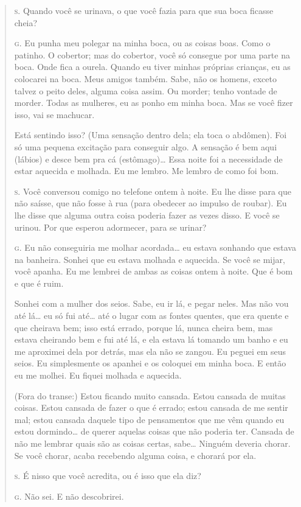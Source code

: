 \begin{quote}
\noindent\hskip0mm\textsc{s.} Quando você se urinava, o que você fazia para que sua boca ficasse
cheia?

\noindent\hskip0mm\textsc{g.} Eu punha meu polegar na minha boca, ou as coisas boas. Como o
patinho. O cobertor; mas do cobertor, você só consegue por uma parte na
boca. Onde fica a ourela. Quando eu tiver minhas próprias crianças, eu
as colocarei na boca. Meus amigos também. Sabe, não os homens, exceto
talvez o peito deles, alguma coisa assim. Ou morder; tenho vontade de
morder. Todas as mulheres, eu as ponho em minha boca. Mas se você fizer
isso, vai se machucar.

Está sentindo isso? (Uma sensação dentro dela; ela toca o abdômen).
Foi só uma pequena excitação para conseguir algo. A sensação é bem aqui
(lábios) e desce bem pra cá (estômago)\ldots{} Essa noite foi a necessidade
de estar aquecida e molhada. Eu me lembro. Me lembro de como foi bom.

\noindent\hskip0mm\textsc{s.} Você conversou comigo no telefone ontem à noite. Eu lhe disse para
que não saísse, que não fosse à rua (para obedecer ao impulso de
roubar). Eu lhe disse que alguma outra coisa poderia fazer as vezes
disso. E você se urinou. Por que esperou adormecer, para se urinar?

\noindent\hskip0mm\textsc{g.} Eu não conseguiria me molhar acordada\ldots{} eu estava sonhando que
estava na banheira. Sonhei que eu estava molhada e aquecida. Se você se
mijar, você apanha. Eu me lembrei de ambas as coisas ontem à noite. Que
é bom e que é ruim.

Sonhei com a mulher dos seios. Sabe, eu ir lá, e pegar neles. Mas
não vou até lá\ldots{} eu só fui até\ldots{} até o lugar com as fontes quentes,
que era quente e que cheirava bem; isso está errado, porque lá, nunca
cheira bem, mas estava cheirando bem e fui até lá, e ela estava lá
tomando um banho e eu me aproximei dela por detrás, mas ela não se
zangou. Eu peguei em seus seios. Eu simplesmente os apanhei e os
coloquei em minha boca. E então eu me molhei. Eu fiquei molhada e
aquecida.

(Fora do transe:) Estou ficando muito cansada. Estou cansada de
muitas coisas. Estou cansada de fazer o que é errado; estou cansada de
me sentir mal; estou cansada daquele tipo de pensamentos que me vêm
quando eu estou dormindo\ldots{} de querer aquelas coisas que não poderia
ter. Cansada de não me lembrar quais são as coisas certas, sabe\ldots{}
Ninguém deveria chorar. Se você chorar, acaba recebendo alguma coisa, e
chorará por ela.

\noindent\hskip0mm\textsc{s.} É nisso que você acredita, ou é isso que ela diz?

\noindent\hskip0mm\textsc{g.} Não sei. E não descobrirei.

\end{quote}

